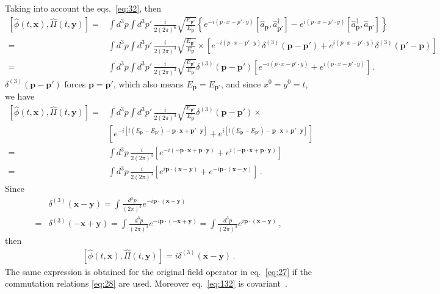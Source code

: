 Taking into account the eqs.~\eqref{eq:32}, then
\begin{align}
  \left[\widehat{\phi}(t,\mathbf{x}),\widehat{\Pi}(t,\mathbf{y})\right]=&
\int d^3p\int d^3p'\,\frac{i}{2(2\pi)^6}\sqrt{\frac{E_{\mathbf{p}'}}{E_{\mathbf{p}}}}\left\{ 
e^{-i (p\cdot x- p'\cdot y) }\left[\widehat{a}_\mathbf{p} ,\widehat{a}_{\mathbf{p}'}^\dagger \right]
-e^{i (p\cdot x- p'\cdot y) }\left[\widehat{a}_\mathbf{p}^\dagger ,\widehat{a}_{\mathbf{p}'} \right]
\right\}\nonumber\\
=&
\int d^3p\int d^3p'\,\frac{i}{2(2\pi)^3}\sqrt{\frac{E_{\mathbf{p}'}}{E_{\mathbf{p}}}}\times\left[
e^{-i (p\cdot x- p'\cdot y) }\delta^{(3)}(\mathbf{p}-\mathbf{p}')
+e^{i (p\cdot x- p'\cdot y) }\delta^{(3)}(\mathbf{p}'-\mathbf{p}) 
\right]\nonumber\\
=&
\int d^3p\int d^3p'\,\frac{i}{2(2\pi)^3}\sqrt{\frac{E_{\mathbf{p}'}}{E_{\mathbf{p}}}}\delta^{(3)}(\mathbf{p}-\mathbf{p}')\left[
e^{-i (p\cdot x- p'\cdot y) }
+e^{i (p\cdot x- p'\cdot y) }
\right]\,.
\end{align}
$\delta^{(3)}(\mathbf{p}-\mathbf{p}')$ forces $\mathbf{p}=\mathbf{p}'$, which also means $E_{\mathbf{p}}=E_{\mathbf{p}'}$, and since $x^0=y^0=t$, we have
\begin{align}
  \left[\widehat{\phi}(t,\mathbf{x}),\widehat{\Pi}(t,\mathbf{y})\right]=&
\int d^3p\int d^3p'\,\frac{i}{2(2\pi)^3}\sqrt{\frac{E_{\mathbf{p}'}}{E_{\mathbf{p}}}}\delta^{(3)}(\mathbf{p}-\mathbf{p}')
\times\nonumber\\
&\left[
e^{-i [t(E_{\mathbf{p}}-E_{\mathbf{p}'})-\mathbf{p}\cdot \mathbf{x}+ \mathbf{p}'\cdot \mathbf{y} ] }
+e^{i[ t(E_{\mathbf{p}}-E_{\mathbf{p}'})-\mathbf{p}\cdot \mathbf{x}+ \mathbf{p}'\cdot \mathbf{y}] }
\right]\nonumber\\
=&\int d^3p\,\frac{i}{2(2\pi)^3}
\left[
e^{-i (-\mathbf{p}\cdot \mathbf{x}+ \mathbf{p}\cdot \mathbf{y} ) }
+e^{i(-\mathbf{p}\cdot \mathbf{x}+ \mathbf{p}\cdot \mathbf{y}) }
\right]\nonumber\\
=&\int d^3p\,\frac{i}{2(2\pi)^3}
\left[
e^{i \mathbf{p}\cdot( \mathbf{x}- \mathbf{y} ) }
+e^{-i\mathbf{p}\cdot( \mathbf{x}-  \mathbf{y}) }
\right]\,.
\end{align}
Since
\begin{align}
 & \delta^{(3)}(\mathbf{x}-\mathbf{y})=\int\frac{d^3p}{(2\pi)^3}e^{-i\mathbf{p}\cdot(\mathbf{x}-\mathbf{y})}\nonumber\\
=&\delta^{(3)}(-\mathbf{x}+\mathbf{y})=\int\frac{d^3p}{(2\pi)^3}e^{-i\mathbf{p}\cdot(-\mathbf{x}+\mathbf{y})}=
\int\frac{d^3p}{(2\pi)^3}e^{i\mathbf{p}\cdot(\mathbf{x}-\mathbf{y})}\,,
\end{align}
then
\begin{align}
\label{eq:132}
    \left[\widehat{\phi}(t,\mathbf{x}),\widehat{\Pi}(t,\mathbf{y})\right]=i\delta^{(3)}(\mathbf{x}-\mathbf{y})\,.
\end{align}
The same expression is obtained for the original field operator in eq.~\eqref{eq:27} if the commutation relations \eqref{eq:28} are used. Moreover eq.~\eqref{eq:132} is covariant~\cite{Lahiri:2005sm}.

